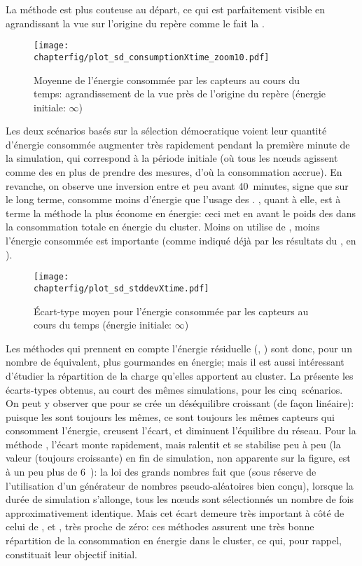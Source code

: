 La méthode \iddemx est plus couteuse au départ, ce qui est parfaitement visible en agrandissant la vue sur l'origine du repère comme le fait la .
\begin{figure}[p]
    \centering
    \texttt{[image: \\chapterfig/plot\_sd\_consumptionXtime\_zoom10.pdf]}
    \caption[Moyenne de l'énergie consommée par les capteurs au cours du temps: agrandissement de la vue près de l'origine du repère]{Moyenne de l'énergie consommée par les capteurs au cours du temps: agrandissement de la vue près de l'origine du repère (énergie initiale: $\infty$)}\label{sd:fig:cons-inf-zoom}
\end{figure}
Les deux scénarios basés sur la sélection démocratique voient leur quantité d'énergie consommée augmenter très rapidement pendant la première minute de la simulation, qui correspond à la période initiale (où tous les nœuds agissent comme des \cns en plus de prendre des mesures, d'où la consommation accrue).
En revanche, on observe une inversion entre \ideres et \iddemx peu avant 40~minutes, signe que sur le long terme, \iddemx consomme moins d'énergie que l'usage des \vns.
\iddems, quant à elle, est à terme la méthode la plus économe en énergie: ceci met en avant le poids des \cns dans la consommation totale en énergie du cluster.
Moins on utilise de \cns, moins l'énergie consommée est importante (comme indiqué déjà par les résultats du , en ).

\begin{figure}[p]
    \centering
    \texttt{[image: \\chapterfig/plot\_sd\_stddevXtime.pdf]}
    \caption[Écart-type moyen pour l'énergie consommée par les capteurs au cours du temps]{Écart-type moyen pour l'énergie consommée par les capteurs au cours du temps (énergie initiale: $\infty$)}\label{sd:fig:stddev-inf}
\end{figure}
\pagebreak %
Les méthodes qui prennent en compte l'énergie résiduelle (\ideres, \iddemx) sont donc, pour un nombre de \cns équivalent, plus gourmandes en énergie; mais il est aussi intéressant d'étudier la répartition de la charge qu'elles apportent au cluster.
La  présente les écarts-types obtenus, au court des mêmes simulations, pour les cinq~scénarios.
On peut y observer que pour \idstat se crée un déséquilibre croissant (de façon linéaire): puisque les \cns sont toujours les mêmes, ce sont toujours les mêmes capteurs qui consomment l'énergie, creusent l'écart, et diminuent l'équilibre du réseau.
Pour la méthode \idrand, l'écart monte rapidement, mais ralentit et se stabilise peu à peu (la valeur (toujours croissante) en fin de simulation, non apparente sur la figure, est à un peu plus de 6~\joule): la loi des grands nombres fait que (sous réserve de l'utilisation d'un générateur de nombres pseudo-aléatoires bien conçu), lorsque la durée de simulation s'allonge, tous les nœuds sont sélectionnés un nombre de fois approximativement identique.
Mais cet écart demeure très important à côté de celui de \ideres, \iddemx et \iddems, très proche de zéro: ces méthodes assurent une très bonne répartition de la consommation en énergie dans le cluster, ce qui, pour rappel, constituait leur objectif initial.

